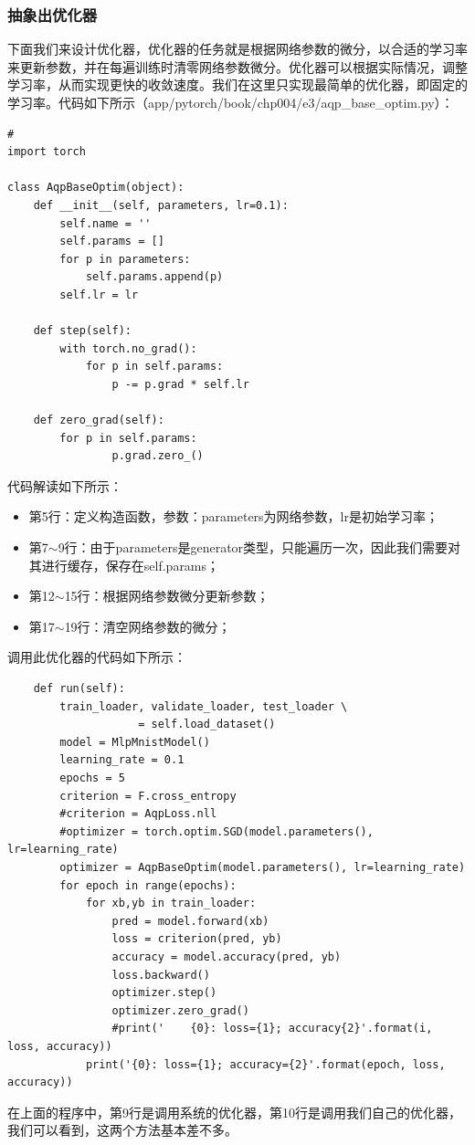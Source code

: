 \documentclass[UTF8]{article}
\begin{document}
\subsubsection{抽象出优化器}
下面我们来设计优化器，优化器的任务就是根据网络参数的微分，以合适的学习率来更新参数，并在每遍训练时清零网络参数微分。优化器可以根据实际情况，调整学习率，从而实现更快的收敛速度。我们在这里只实现最简单的优化器，即固定的学习率。代码如下所示（app/pytorch/book/chp004/e3/aqp\_base\_optim.py）：
\begin{lstlisting}
#
import torch

class AqpBaseOptim(object):
    def __init__(self, parameters, lr=0.1):
        self.name = ''
        self.params = []
        for p in parameters:
            self.params.append(p)
        self.lr = lr

    def step(self):
        with torch.no_grad():
            for p in self.params:
                p -= p.grad * self.lr

    def zero_grad(self):
        for p in self.params:
                p.grad.zero_()
\end{lstlisting}
代码解读如下所示：
\begin{itemize}
\item 第5行：定义构造函数，参数：parameters为网络参数，lr是初始学习率；
\item 第7$\sim$9行：由于parameters是generator类型，只能遍历一次，因此我们需要对其进行缓存，保存在self.params；
\item 第12$\sim$15行：根据网络参数微分更新参数；
\item 第17$\sim$19行：清空网络参数的微分；
\end{itemize}
调用此优化器的代码如下所示：
\begin{lstlisting}
    def run(self):
        train_loader, validate_loader, test_loader \
                    = self.load_dataset()
        model = MlpMnistModel()
        learning_rate = 0.1
        epochs = 5
        criterion = F.cross_entropy
        #criterion = AqpLoss.nll
        #optimizer = torch.optim.SGD(model.parameters(), lr=learning_rate)
        optimizer = AqpBaseOptim(model.parameters(), lr=learning_rate)
        for epoch in range(epochs):
            for xb,yb in train_loader:
                pred = model.forward(xb)
                loss = criterion(pred, yb)
                accuracy = model.accuracy(pred, yb)
                loss.backward()
                optimizer.step()
                optimizer.zero_grad()
                #print('    {0}: loss={1}; accuracy{2}'.format(i, loss, accuracy))
            print('{0}: loss={1}; accuracy={2}'.format(epoch, loss, accuracy))
\end{lstlisting}
在上面的程序中，第9行是调用系统的优化器，第10行是调用我们自己的优化器，我们可以看到，这两个方法基本差不多。
\end{document}
